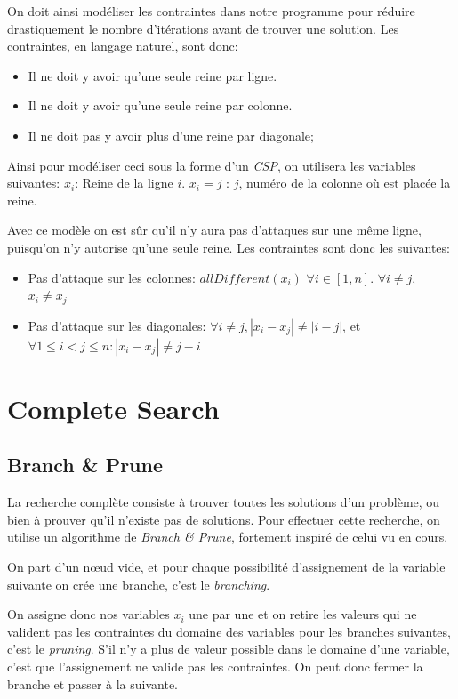 \documentclass{article}
\begin{document}
On doit ainsi modéliser les contraintes dans notre programme pour réduire drastiquement le nombre d'itérations avant de trouver une solution. Les contraintes, en langage naturel, sont donc:

\begin{itemize}
\item Il ne doit y avoir qu'une seule reine par ligne.
\item Il ne doit y avoir qu'une seule reine par colonne.
\item Il ne doit pas y avoir plus d'une reine par diagonale;
\end{itemize}

Ainsi pour modéliser ceci sous la forme d'un \emph{CSP}, on utilisera les variables suivantes:
$x_i$: Reine de la ligne $i$.
$x_i = j$ : $j$, numéro de la colonne où est placée la reine.

Avec ce modèle on est sûr qu'il n'y aura pas d'attaques sur une même ligne, puisqu'on n'y autorise qu'une seule reine.
Les contraintes sont donc les suivantes:
\begin{itemize}
\item Pas d'attaque sur les colonnes: $allDifferent(x_i)$ $\forall i \in [1, n]$. $\forall i \neq j$, $x_i \neq x_j$

\item Pas d'attaque sur les diagonales:  $\forall i \neq j, |x_i - x_j| \neq |i - j|$, et $\forall  1 \leq i < j \leq n : |x_i - x_j | \neq j - i$
\end{itemize}


\section{Complete Search}

\subsection{Branch \& Prune}
La recherche complète consiste à trouver toutes les solutions d'un problème, ou bien à prouver qu'il n'existe pas de solutions. 
Pour effectuer cette recherche, on utilise un algorithme de \emph{Branch \& Prune}, fortement inspiré de celui vu en cours. 

On part d'un nœud vide, et pour chaque possibilité d'assignement de la variable suivante on crée une branche, c'est le \emph{branching}.

On assigne donc nos variables $x_i$ une par une et on retire les valeurs qui ne valident pas les contraintes du domaine des variables pour les branches suivantes, c'est le \emph{pruning}. S'il n'y a plus de valeur possible dans le domaine d'une variable, c'est que l'assignement ne valide pas les contraintes. On peut donc fermer la branche et passer à la suivante.
\end{document}
